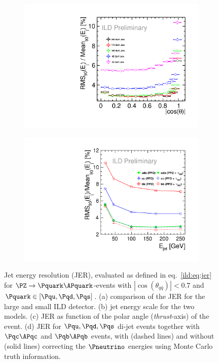 \begin{figure}[htbp]
\begin{subfigure}{0.49\hsize}
 \caption{  \label{fig:perf:pfa_jes}}
 \end{subfigure}
\begin{subfigure}{0.49\hsize} 
 \includegraphics[width=\hsize]{Performance/fig/JER_uds_costh_IDR.pdf}
 \caption{ \label{fig:perf:pfa_udscb}}
 \end{subfigure}
\begin{subfigure}{0.49\hsize} 
 \includegraphics[width=\hsize]{Performance/fig/JERs_bcuds_pfo_vs_pfo_plus_nu.pdf}
 \caption{  \label{fig:perf:pfa_costh}}
 \end{subfigure}
\caption{
  Jet energy resolution (JER), evaluated as defined in eq.~\ref{ild:eq:jer} for $\PZ\rightarrow \Pquark\APquark$-events with $|\cos(\theta_{q\bar q})|<0.7$
  and $\Pquark \in [\Pqu,\Pqd,\Pqs]$. (a) comparison of the JER for the large and small ILD detector. (b) jet energy scale for the two models. (c) JER as
  function of the polar angle ({\em thrust}-axis) of the event. (d) JER for $\Pqu,\Pqd,\Pqs$ di-jet events together with $\Pqc\APqc$ and $\Pqb\APqb$ events,
  with (dashed lines) and without (solid lines) correcting the $\Pneutrino$ energies using Monte Carlo truth information.
  }
\label{fig:perf:pfa}
\end{figure}
